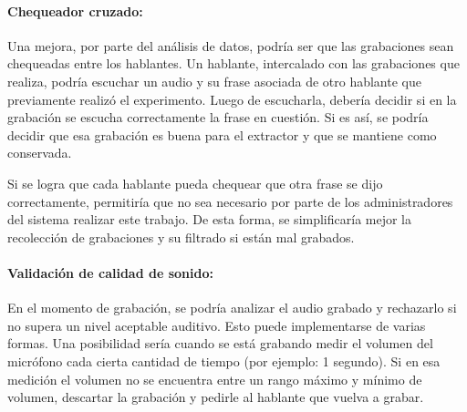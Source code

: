 

\paragraph*{Chequeador cruzado:} Una mejora, por parte del análisis de datos, podría ser que las grabaciones sean chequeadas entre los hablantes. Un hablante, intercalado con las grabaciones que realiza, podría escuchar un audio y su frase asociada de otro hablante que previamente realizó el experimento. Luego de escucharla, debería decidir si en la grabación se escucha correctamente la frase en cuestión. Si es así, se podría decidir que esa grabación es buena para el extractor y que se mantiene como conservada.

Si se logra que cada hablante pueda chequear que otra frase se dijo correctamente, permitiría que no sea necesario por parte de los administradores del sistema realizar este trabajo. De esta forma, se simplificaría mejor la recolección de grabaciones y su filtrado si están mal grabados.

\paragraph*{Validación de calidad de sonido:} En el momento de grabación, se podría analizar el audio grabado y rechazarlo si no supera un nivel aceptable auditivo. Esto puede implementarse de varias formas. Una posibilidad sería cuando se está grabando medir el volumen del micrófono cada cierta cantidad de tiempo (por ejemplo: 1 segundo). Si en esa medición el volumen no se encuentra entre un rango máximo y mínimo de volumen, descartar la grabación y pedirle al hablante que vuelva a grabar.

